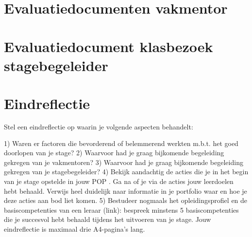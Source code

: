 \documentclass[a4paper,12pt,twoside]{article}%
\begin{document}
	
	\newpage
	\section{Evaluatiedocumenten vakmentor}
	
	
	
	
	
	
	
	
	
	
	

	
	
	
	\section{Evaluatiedocument klasbezoek stagebegeleider}
	
	\section{Eindreflectie}
	Stel een eindreflectie op waarin je volgende aspecten behandelt: 
	
	1) Waren er factoren die bevorderend of belemmerend werkten m.b.t. het goed doorlopen van je stage? 
	2) Waarvoor had je graag bijkomende begeleiding gekregen van je vakmentoren? 
	3) Waarvoor had je graag bijkomende begeleiding gekregen van je stagebegeleider? 
	4) Bekijk aandachtig de acties die je in het begin van je stage opstelde in jouw POP . Ga na of je via de acties jouw leerdoelen hebt behaald. Verwijs heel duidelijk naar informatie in je portfolio waar en hoe je deze acties aan bod liet komen. 
	5)  Bestudeer nogmaals het opleidingsprofiel en de basiscompetenties van een leraar (link):  bespreek minstens 5 basiscompetenties die je succesvol hebt behaald tijdens het uitvoeren van je stage. 
	Jouw eindreflectie is maximaal drie A4-pagina’s lang. 
	
\end{document}
